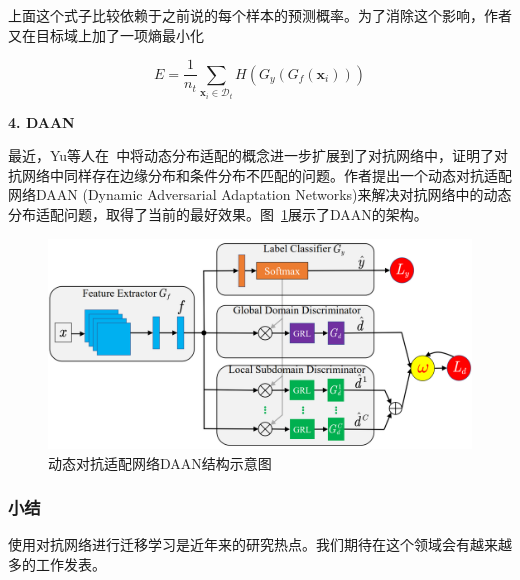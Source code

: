 上面这个式子比较依赖于之前说的每个样本的预测概率。为了消除这个影响，作者又在目标域上加了一项熵最小化

\begin{equation}
	E=\frac{1}{n_t} \sum_{\mathbf{x}_i \in \mathcal{D}_t} H(G_y(G_f(\mathbf{x}_i)))
\end{equation}

\textbf{4. DAAN}

最近，Yu等人在~\cite{yu2019transfer}中将动态分布适配的概念进一步扩展到了对抗网络中，证明了对抗网络中同样存在边缘分布和条件分布不匹配的问题。作者提出一个动态对抗适配网络DAAN (Dynamic Adversarial Adaptation Networks)来解决对抗网络中的动态分布适配问题，取得了当前的最好效果。图~\ref{fig-deep-daan}展示了DAAN的架构。

\begin{figure}[htbp]
	\centering
	\includegraphics[scale=.35]{./figures/fig-distribution-daan.png}
	\caption{动态对抗适配网络DAAN结构示意图}
	\label{fig-deep-daan}
\end{figure}

\subsubsection{小结}

使用对抗网络进行迁移学习是近年来的研究热点。我们期待在这个领域会有越来越多的工作发表。